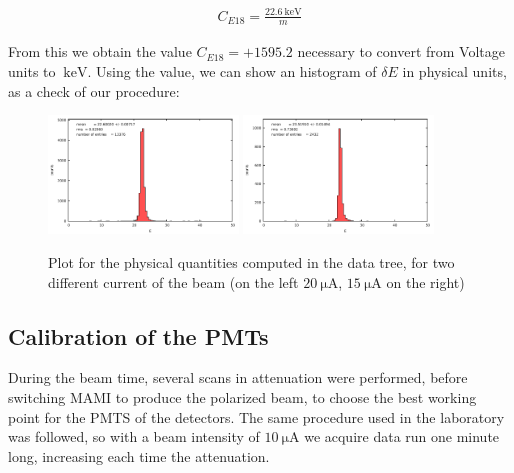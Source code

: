 \begin{align*}
C_{E18} =  \frac{\SI{22.6}{\kilo \electronvolt}}{m}
\end{align*}

From this we obtain the value $C_{E18} = +1595.2$ necessary to convert from Voltage units to $\SI{}{\kilo \electronvolt}$. Using the value, we can show an histogram of $\delta E$ in physical units, as a check of our procedure:

\begin{figure}[hbtp]
\centering
\includegraphics[width = 0.45\textwidth]{Analysis/ENMOCheck20.pdf}
\includegraphics[width = 0.45\textwidth]{Analysis/ENMOCheck15.pdf} 
\caption{Plot for the physical quantities computed in the data tree, for two different current of the beam (on the left $\SI{20}{\micro \ampere}$, $\SI{15}{\micro \ampere}$ on the right)}
\end{figure}

\subsection{Calibration of the PMTs}


During the beam time, several scans in attenuation were performed, before switching MAMI to produce the polarized beam, to choose the best working point for the PMTS of the detectors. The same procedure used in the laboratory was followed, so with a beam intensity of $\SI{10}{\micro \ampere}$ we acquire data run one minute long, increasing each time the attenuation.

